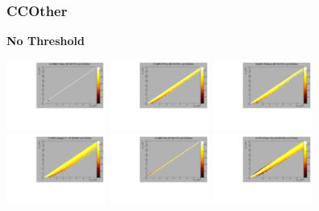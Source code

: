 \subsubsection{CCOther}

\textbf{No Threshold}

\begin{center}

  \includegraphics[width=0.245\textwidth]{plots/response_matrix/Proton_KE_RHC_CCOther_null.pdf}
  \includegraphics[width=0.245\textwidth]{plots/response_matrix/PiPlus_KE_RHC_CCOther_null.pdf}
  \includegraphics[width=0.245\textwidth]{plots/response_matrix/PiMinus_KE_RHC_CCOther_null.pdf}
  \includegraphics[width=0.245\textwidth]{plots/response_matrix/Charged_Pi_KE_RHC_CCOther_null.pdf}
  \includegraphics[width=0.245\textwidth]{plots/response_matrix/Pi0_KE_RHC_CCOther_null.pdf}
  \includegraphics[width=0.245\textwidth]{plots/response_matrix/Proton+Pion_KE_RHC_CCOther_null.pdf}

\end{center}
